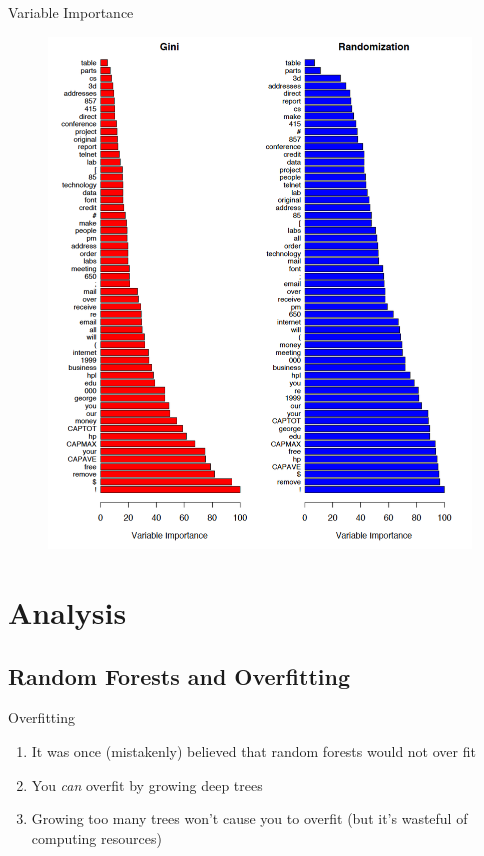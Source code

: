 \documentclass[pdf]{beamer}
\begin{document}
		\begin{frame}{Variable Importance}
			\begin{figure}
				\includegraphics[scale = 0.25]{variable_importance.png}
			\end{figure}		
    		\end{frame}
		





\section{Analysis}

	\subsection{Random Forests and Overfitting}
	
		\begin{frame}{Overfitting}
			\begin{enumerate}
				\item It was once (mistakenly) believed that random forests would not over fit
				\item You \textit{can} overfit by growing deep trees
				\item Growing too many trees won't cause you to overfit (but it's wasteful of computing resources)
			\end{enumerate}
		\end{frame}
		
\end{document}
